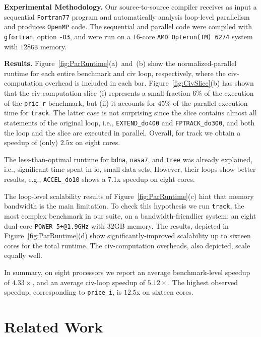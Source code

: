 \documentclass[10pt,nocopyrightspace]{sigplanconf}
\begin{document}
\vspace{1ex}

{\bf Experimental Methodology.} Our source-to-source compiler receives as
input a sequential {\tt Fortran77} program and automatically analysis loop-level 
parallelism and produces {\tt OpenMP} code.  The sequential and parallel 
code were compiled with {\tt gfortran}, option {\tt -O3}, and were run on 
a $16$-core {\tt AMD Opteron(TM) 6274} system with $128${\tt GB} memory. 

\vspace{1ex}

{\bf Results.} Figure~\ref{fig:ParRuntime}(a)~and~(b) show
the normalized-parallel runtime for each entire benchmark 
and {\sc civ} loop, respectively, where the {\sc civ}-computation
overhead is included in each bar.
%
Figure~\ref{fig:CivSlice}(b) has shown that the {\sc civ}-computation slice 
(i) represents a small fraction $6\%$ of the execution of the 
{\tt pric\_r} benchmark,
but (ii) it accounts for $45\%$ of the parallel execution time for {\tt track}.
The latter case is not surprising since the slice contains almost all statements 
of the original loop, i.e., {\tt EXTEND\_do400} and {\tt FPTRACK\_do300}, 
and both the loop and the slice are executed in parallel.    
Overall, for track we obtain a speedup of (only) $2.5$x on eight cores.


The less-than-optimal runtime for {\tt bdna}, {\tt nasa7}, and 
{\tt tree} was already explained, i.e., significant time spent in {\sc io},
small data sets. However, their loops show better results,
e.g., {\tt ACCEL\_do10} shows a  $7.1$x speedup on eight cores. %

The loop-level scalability results of Figure~\ref{fig:ParRuntime}(c) 
hint that memory bandwidth is the main limitation. 
%
To check this hypothesis we run {\tt track}, the most complex benchmark in our suite, 
on a bandwidth-friendlier system: an eight dual-core {\tt POWER 5+@1.9GHz} with $32$GB memory. 
The results, depicted in Figure~\ref{fig:ParRuntime}(d) show 
significantly-improved scalability up to sixteen cores for the 
total runtime. 
The {\sc civ}-computation overheads, also depicted, scale equally well.  
 
In summary, on eight processors we report an average benchmark-level
speedup of $4.33\times$, and an average {\sc civ}-loop speedup of $5.12\times$. 
The highest observed speedup, corresponding to {\tt price\_i}, is $12.5$x 
on sixteen cores.

 
\section{Related Work}  
\label{sec:RelWork}
\end{document}
